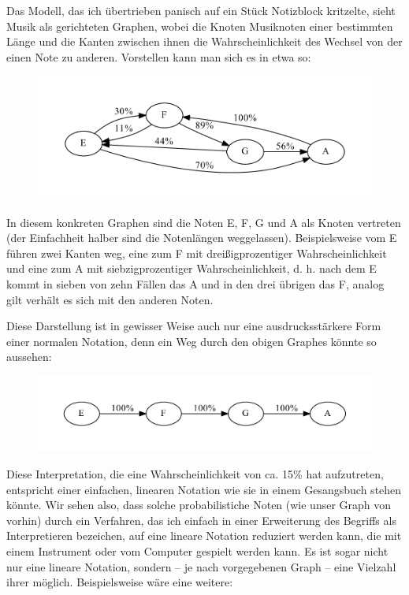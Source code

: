 \documentclass[a4paper,twocolumn]{article}
\begin{document}
Das Modell, das ich übertrieben panisch auf ein Stück Notizblock kritzelte,
sieht Musik als gerichteten Graphen, wobei die Knoten Musiknoten einer
bestimmten Länge und die Kanten zwischen ihnen die Wahrscheinlichkeit des
Wechsel von der einen Note zu anderen. Vorstellen kann man sich es in etwa so:

\begin{figure}[h]
\includegraphics[width=.5\textwidth]{example-graph}
\end{figure}

In diesem konkreten Graphen sind die Noten E, F, G und A als Knoten vertreten
(der Einfachheit halber sind die Notenlängen weggelassen). Beispielsweise vom E
führen zwei Kanten weg, eine zum F mit dreißigprozentiger Wahrscheinlichkeit und
eine zum A mit siebzigprozentiger Wahrscheinlichkeit, d. h. nach dem E kommt in
sieben von zehn Fällen das A und in den drei übrigen das F, analog gilt verhält
es sich mit den anderen Noten.

Diese Darstellung ist in gewisser Weise auch nur eine ausdrucksstärkere Form
einer normalen Notation, denn ein Weg durch den obigen
Graphes könnte so aussehen:

\begin{figure}[h]
\includegraphics[width=.5\textwidth]{example-graph-interpretation}
\end{figure}

Diese Interpretation, die eine Wahrscheinlichkeit von ca. 15\% hat aufzutreten,
entspricht einer einfachen, linearen Notation wie sie in einem Gesangsbuch
stehen könnte. Wir sehen also, dass solche probabilistiche Noten (wie unser
Graph von vorhin) durch ein Verfahren, das ich einfach in einer Erweiterung des
Begriffs als Interpretieren bezeichen, auf eine lineare Notation reduziert
werden kann, die mit einem Instrument oder vom Computer gespielt werden kann. Es
ist sogar nicht nur eine lineare Notation, sondern -- je nach vorgegebenen Graph
-- eine Vielzahl ihrer möglich. Beispielsweise wäre eine weitere:
\end{document}
